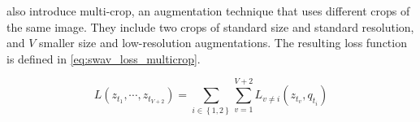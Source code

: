 \citeauthor{swav_2020} also introduce multi-crop, an augmentation technique that uses different 
crops of the same image.
They include two crops of standard size and standard resolution, 
and $V$ smaller size and low-resolution augmentations.
The resulting loss function is defined in \eqref{eq:swav_loss_multicrop}.

\begin{equation}
    L(z_{t_{1}}, \cdots , z_{t_{V+2}})= \sum_{i\in \left\{ 1,2 \right\} }^{}\sum_{v=1}^{V+2} L_{v \neq i}(z_{t_{v}}, q_{t_{i}})
    \label{eq:swav_loss_multicrop}
\end{equation}